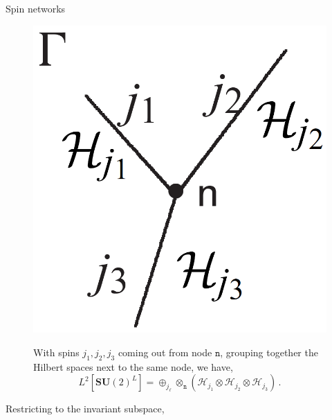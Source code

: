 \documentclass[12pt,titlepage]{article}
\begin{document}
\begin{frame}{Spin networks}
    \begin{list}{\,}{\leftmargin=1em \itemindent=0em}
        \item<1-> \noindent\FloatBarrier
        \begin{figure}[!ht]
            \begin{minipage}{0.15\linewidth}
                \includegraphics[width=\linewidth]{4.11}
            \end{minipage}
            \begin{minipage}{0.85\linewidth}
                With spins $j_1,j_2,j_3$ coming out from node $\mathtt{n}$, grouping together the Hilbert spaces next to the same node, we have,
                \begin{equation}
                    L^2[{\mathbf{SU}(2)}^L]=\oplus_{j_\ell}\otimes_\mathtt{n}(\mathcal{H}_{j_1}\otimes\mathcal{H}_{j_2}\otimes\mathcal{H}_{j_3})\,.
                \end{equation}
            \end{minipage}
        \end{figure}\FloatBarrier
        \item<2-> Restricting to the invariant subspace,
        \begin{equation}

\end{equation}
\end{list}
\end{frame}
\end{document}
